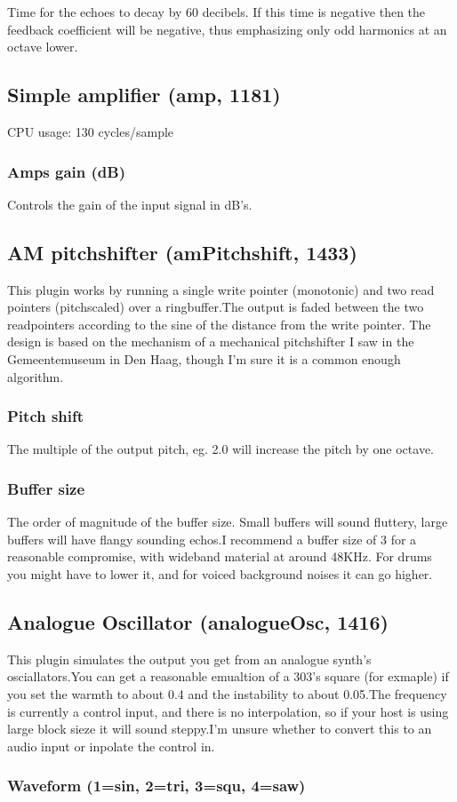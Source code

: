 \documentclass[11pt]{article}
\begin{document}
       Time for the echoes to decay by 60 decibels. If this time is negative
       then the feedback coefficient will be negative, thus emphasizing only odd
       harmonics at an octave lower.
      \subsection{Simple amplifier (amp, 1181)\label{amp}\label{id1181}}
CPU usage: 130 cycles/sample

\subsubsection*{Amps gain (dB)}
Controls the gain of the input signal in dB's.\subsection{AM pitchshifter (amPitchshift, 1433)\label{amPitchshift}\label{id1433}}
This plugin works by running a single write pointer (monotonic) and two read pointers (pitchscaled) over a ringbuffer.The output is faded between the two readpointers according to the sine of the distance from the write pointer. The design is based on the mechanism of a mechanical pitchshifter I saw in the Gemeentemuseum in Den Haag, though I'm sure it is a common enough algorithm.\subsubsection*{Pitch shift}
The multiple of the output pitch, eg. 2.0 will increase the pitch by one octave.\subsubsection*{Buffer size}
The order of magnitude of the buffer size. Small buffers will sound fluttery, large buffers will have flangy sounding echos.I recommend a buffer size of 3 for a reasonable compromise, with wideband material at around 48KHz. For drums you might have to lower it, and for voiced background noises it can go higher.\subsection{Analogue Oscillator (analogueOsc, 1416)\label{analogueOsc}\label{id1416}}
This plugin simulates the output you get from an analogue synth's osciallators.You can get a reasonable emualtion of a 303's square (for exmaple) if you set the warmth to about 0.4 and the instability to about 0.05.The frequency is currently a control input, and there is no interpolation, so if your host is using large block sieze it will sound steppy.I'm unsure whether to convert this to an audio input or inpolate the control in.\subsubsection*{Waveform (1=sin, 2=tri, 3=squ, 4=saw)}
\end{document}
